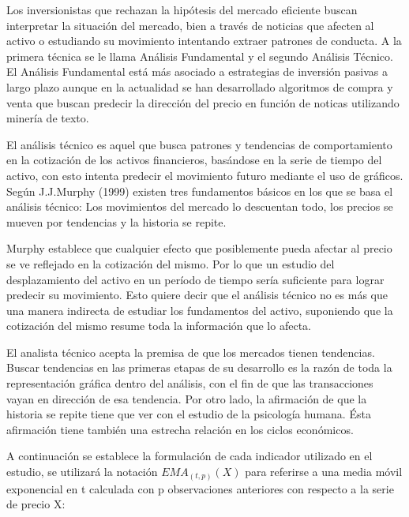 \documentclass[a4paper,12pt]{Latex/Classes/PhDthesisPSnPDF}
\begin{document}
Los inversionistas que rechazan la hipótesis del mercado eficiente buscan interpretar la situación del mercado, bien a través de noticias que afecten al activo o estudiando su movimiento intentando extraer patrones de conducta. A la primera técnica se le llama Análisis Fundamental y el segundo Análisis Técnico. El Análisis Fundamental está más asociado a estrategias de inversión pasivas a largo plazo aunque en la actualidad se han desarrollado algoritmos de compra y venta que buscan predecir la dirección del precio en función de noticas utilizando minería de texto.

El análisis técnico es aquel que busca patrones y tendencias de comportamiento en la cotización de los activos financieros, basándose en la serie de tiempo del activo, con esto intenta predecir el movimiento futuro mediante el uso de gráficos. Según J.J.Murphy (1999) existen tres fundamentos básicos en los que se basa el análisis técnico: Los movimientos del mercado lo descuentan  todo, los precios se mueven por tendencias y la historia se repite.

Murphy establece que cualquier efecto que posiblemente pueda afectar al precio se ve reflejado en la cotización del mismo. Por lo que un estudio del desplazamiento del activo en un período de tiempo sería suficiente para lograr predecir su movimiento. Esto quiere decir que el análisis técnico no es más que una manera indirecta de estudiar los fundamentos del activo, suponiendo que la cotización del mismo resume toda la información que lo afecta. 

El analista técnico acepta la premisa de que los mercados tienen tendencias. Buscar tendencias en las primeras etapas de su desarrollo es la razón de toda la representación gráfica dentro del análisis, con el fin de que las transacciones vayan en dirección de esa tendencia. Por otro lado, la afirmación de que la historia se repite tiene que ver con el estudio de la psicología humana. Ésta afirmación tiene también una estrecha relación en los ciclos económicos. 

A continuación se establece la formulación de cada indicador utilizado en el estudio, se utilizará la notación $EMA_{(t, p)}(X)$ para referirse a una media móvil exponencial en t calculada con p observaciones anteriores con respecto a la serie de precio X:
\end{document}
